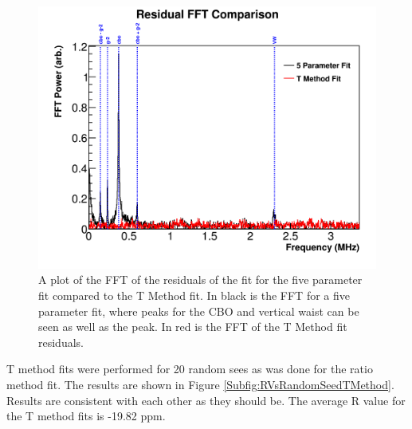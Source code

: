 	\begin{figure}[]
		\centering
		\includegraphics[width=\textwidth]{FFTComparison_TMethod}
	    \caption[FFTComparison_TMethod]{A plot of the FFT of the residuals of the fit for the five parameter fit compared to the T Method fit. In black is the FFT for a five parameter fit, where peaks for the CBO and vertical waist can be seen as well as the \gmtwo peak. In red is the FFT of the T Method fit residuals.}
	    \label{fig:FFTComparison_TMethod}
	\end{figure}


	T method fits were performed for 20 random sees as was done for the ratio method fit. The results are shown in Figure \ref{Subfig:RVsRandomSeedTMethod}. Results are consistent with each other as they should be. The average R value for the T method fits is -19.82 ppm.

